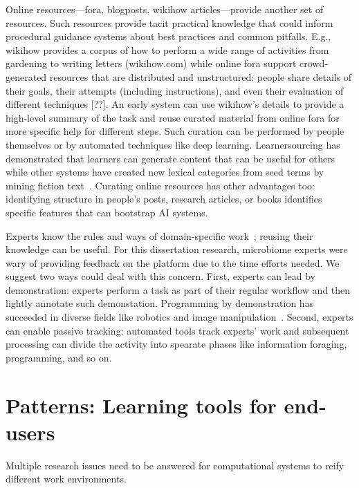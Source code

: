 Online resources---fora, blogposts, wikihow articles---provide another set of resources. Such resources provide tacit practical knowledge that could inform procedural guidance systems about best practices and common pitfalls. E.g., wikihow provides a corpus of how to perform a wide range of activities from gardening to writing letters (wikihow.com) while online fora support crowd-generated resources that are distributed and unstructured: people share details of their goals, their attempts (including instructions), and even their evaluation of different techniques [??]. An early system can use wikihow's details to provide a high-level summary of the task and reuse curated material from online fora for more specific help for different steps. Such curation can be performed by people themselves or by automated techniques like deep learning. Learnersourcing has demonstrated that learners can generate content that can be useful for others~\cite{Kim2015f} while other systems have created new lexical categories from seed terms by mining fiction text~\cite{fast2016empath}. Curating online resources has other advantages too: identifying structure in people's posts, research articles, or books identifies specific features that can bootstrap AI systems.

Experts know the rules and ways of domain-specific work~\cite{Francis2006}; reusing their knowledge can be useful. For this dissertation research, microbiome experts were wary of providing feedback on the platform due to the time efforts needed. We suggest two ways could deal with this concern. First, experts can lead by demonstration: experts perform a task as part of their regular workflow and then lightly annotate such demonstation. Programming by demonstration has succeeded in diverse fields like robotics and image manipulation~\cite{cypher1993watch}. Second, experts can enable passive tracking: automated tools track experts' work and subsequent processing can divide the activity into spearate phases like information foraging, programming, and so on.


\section{Patterns: Learning tools for end-users} 
Multiple research issues need to be answered for computational systems to reify different work environments. 

